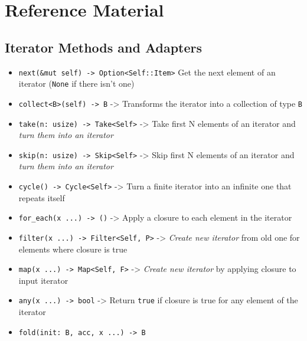 \documentclass[
  11pt,
]{article}
\author{}
\date{}
\providecommand{\tightlist}{%
  \setlength{\itemsep}{0pt}\setlength{\parskip}{0pt}}
\begin{document}
\section{Reference Material}\label{reference-material}

\subsection{Iterator Methods and
Adapters}\label{iterator-methods-and-adapters}

\begin{itemize}
\tightlist
\item
  \texttt{next(\&mut\ self)\ -\textgreater{}\ Option\textless{}Self::Item\textgreater{}}
  Get the next element of an iterator (\texttt{None} if there isn't one)
\item
  \texttt{collect\textless{}B\textgreater{}(self)\ -\textgreater{}\ B}
  -\textgreater{} Transforms the iterator into a collection of type
  \texttt{B}
\item
  \texttt{take(n:\ usize)\ -\textgreater{}\ Take\textless{}Self\textgreater{}}
  -\textgreater{} Take first N elements of an iterator and \emph{turn
  them into an iterator}
\item
  \texttt{skip(n:\ usize)\ -\textgreater{}\ Skip\textless{}Self\textgreater{}}
  -\textgreater{} Skip first N elements of an iterator and \emph{turn
  them into an iterator}
\item
  \texttt{cycle()\ -\textgreater{}\ Cycle\textless{}Self\textgreater{}}
  -\textgreater{} Turn a finite iterator into an infinite one that
  repeats itself
\item
  \texttt{for\_each(\textbar{}x\textbar{}\ ...)\ -\textgreater{}\ ()}
  -\textgreater{} Apply a closure to each element in the iterator
\item
  \texttt{filter(\textbar{}x\textbar{}\ ...)\ -\textgreater{}\ Filter\textless{}Self,\ P\textgreater{}}
  -\textgreater{} \emph{Create new iterator} from old one for elements
  where closure is true
\item
  \texttt{map(\textbar{}x\textbar{}\ ...)\ -\textgreater{}\ Map\textless{}Self,\ F\textgreater{}}
  -\textgreater{} \emph{Create new iterator} by applying closure to
  input iterator
\item
  \texttt{any(\textbar{}x\textbar{}\ ...)\ -\textgreater{}\ bool}
  -\textgreater{} Return \texttt{true} if closure is true for any
  element of the iterator
\item
  \texttt{fold(init:\ B,\ \textbar{}acc,\ x\textbar{}\ ...)\ -\textgreater{}\ B}

\end{itemize}
\end{document}
